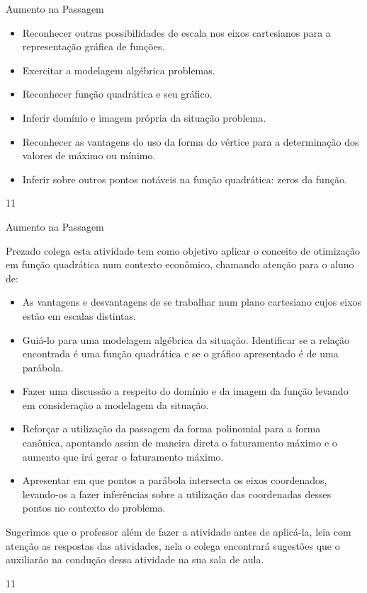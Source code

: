 \cleardoublepage
\def\currentcolor{session1}
\begin{objectives}{Aumento na Passagem}
{
\begin{itemize}
\item Reconhecer outras possibilidades de escala nos eixos
cartesianos para a representação gráfica de funções.
\item Exercitar a modelagem algébrica problemas.
\item Reconhecer função quadrática e seu gráfico.
\item Inferir domínio e imagem própria da situação problema.
\item Reconhecer as vantagens do uso da forma do vértice para a determinação dos valores de máximo ou mínimo.
\item Inferir sobre outros pontos notáveis na função quadrática: zeros da função.
\end{itemize}
}{1}{1}
\end{objectives}
\begin{sugestions}{Aumento na Passagem}
{
Prezado colega esta atividade tem como objetivo aplicar o conceito de otimização em função quadrática num contexto econômico, chamando atenção para o aluno de:

\begin{itemize}
\item As vantagens e desvantagens de se trabalhar num plano cartesiano cujos eixos estão em escalas distintas.
\item Guiá-lo para uma modelagem algébrica da situação.
Identificar se a relação encontrada é uma função quadrática e se o gráfico apresentado é de uma parábola.
\item Fazer uma discussão a respeito do domínio e da imagem da função levando em consideração a modelagem da situação.
\item Reforçar a utilização da passagem da forma polinomial para a forma canônica, apontando assim de maneira direta o faturamento máximo e o aumento que irá gerar o faturamento máximo.
\item Apresentar em que pontos a parábola intersecta os eixos coordenados, levando-os a fazer inferências sobre a utilização das coordenadas desses pontos no contexto do problema.
\end{itemize}

Sugerimos que o professor além de fazer a atividade antes de aplicá-la, leia com atenção as respostas das atividades, nela o colega encontrará sugestões que o auxiliarão na condução dessa atividade na sua sala de aula.
}{1}{1}
\end{sugestions}
